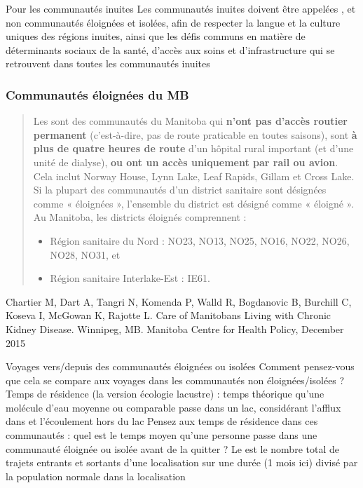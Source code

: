 \documentclass[aspectratio=169]{beamer}\usepackage[]{graphicx}\usepackage[]{xcolor}
\begin{document}
\begin{frame}{Pour les communautés inuites}
  Les communautés inuites doivent être appelées , et non communautés éloignées et isolées, afin de respecter la langue et la culture uniques des régions inuites, ainsi que les défis communs en matière de déterminants sociaux de la santé, d'accès aux soins et d'infrastructure qui se retrouvent dans toutes les communautés inuites
\end{frame}

\begin{frame}\frametitle{Communautés éloignées du MB}
  \begin{quote}
  Les  sont des communautés du Manitoba qui \textbf{n'ont pas d'accès routier permanent} (c'est-à-dire, pas de route praticable en toutes saisons), sont \textbf{à plus de quatre heures de route} d'un hôpital rural important (et d'une unité de dialyse), \textbf{ou ont un accès uniquement par rail ou avion}. Cela inclut Norway House, Lynn Lake, Leaf Rapids, Gillam et Cross Lake. Si la plupart des communautés d'un district sanitaire sont désignées comme « éloignées », l'ensemble du district est désigné comme « éloigné ». Au Manitoba, les districts éloignés comprennent :
  \begin{itemize}
  \item Région sanitaire du Nord : NO23, NO13, NO25, NO16, NO22, NO26, NO28, NO31, et
  \item Région sanitaire Interlake-Est : IE61.
  \end{itemize}
  \end{quote}
  \vfill
  \small
  Chartier M, Dart A, Tangri N, Komenda P, Walld R, Bogdanovic B, Burchill C, Koseva I, McGowan K, Rajotte L. Care of Manitobans Living with Chronic Kidney Disease. Winnipeg, MB.
  Manitoba Centre for Health Policy, December 2015
\end{frame}


\begin{frame}{Voyages vers/depuis des communautés éloignées ou isolées}
  Comment pensez-vous que cela se compare aux voyages dans les communautés non éloignées/isolées ?
  \vfill
  Temps de résidence (la version écologie lacustre) : temps théorique qu'une molécule d'eau moyenne ou comparable passe dans un lac, considérant l'afflux dans et l'écoulement hors du lac
  \vfill
  Pensez aux temps de résidence dans ces communautés : quel est le temps moyen qu'une personne passe dans une communauté éloignée ou isolée avant de la quitter ?
  \vfill
  Le  est le nombre total de trajets entrants et sortants d'une localisation sur une durée (1 mois ici) divisé par la population normale dans la localisation 
\end{frame}
\end{document}
